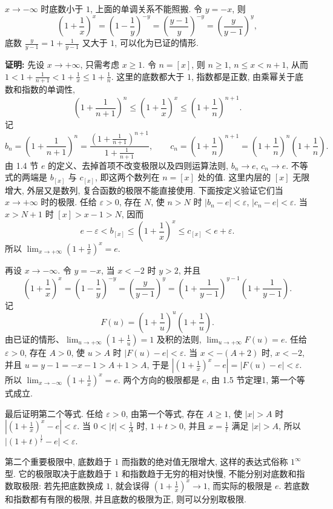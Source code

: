 \documentclass[UTF8,openany]{ctexbook}
\theoremstyle{chinesetextbook}
\newenvironment{cnproof}{\par\indent\textbf{证明:} \ignorespaces}{\par}
\begin{document}
$x\to-\infty$ 时底数小于 $1$, 上面的单调关系不能照搬. 令 $y=-x$, 则
\[
\left(1+\frac1x\right)^x=\left(1-\frac1y\right)^{-y}=\left(\frac{y-1}y\right)^{-y}=\left(\frac y{y-1}\right)^y,
\]
底数 $\displaystyle\frac y{y-1}=1+\frac1{y-1}$ 又大于 $1$, 可以化为已证的情形.
\begin{cnproof}
先设 $x\to+\infty$, 只需考虑 $x\ge1$. 令 $n=[x]$, 则 $n\ge1$, $n\le x<n+1$, 从而 $\displaystyle1<1+\frac1{n+1}<1+\frac1x\le1+\frac1n$. 这里的底数都大于 $1$, 指数都是正数, 由乘幂关于底数和指数的单调性,
\[
\left(1+\frac1{n+1}\right)^n\le\left(1+\frac1x\right)^x\le\left(1+\frac1n\right)^{n+1}.
\]
记
\[
b_n=\left(1+\frac1{n+1}\right)^n=\frac{\left(1+\frac1{n+1}\right)^{n+1}}{1+\frac1{n+1}},\qquad c_n=\left(1+\frac1n\right)^{n+1}=\left(1+\frac1n\right)^n\left(1+\frac1n\right).
\]
由 1.4 节 $e$ 的定义、去掉首项不改变极限以及四则运算法则, $b_n\to e$, $c_n\to e$. 不等式的两端是 $b_{[x]}$ 与 $c_{[x]}$, 即这两个数列在 $n=[x]$ 处的值. 这里内层的 $[x]$ 无限增大, 外层又是数列, 复合函数的极限不能直接使用. 下面按定义验证它们当 $x\to+\infty$ 时的极限. 任给 $\varepsilon>0$, 存在 $N$, 使 $n>N$ 时 $|b_n-e|<\varepsilon$, $|c_n-e|<\varepsilon$. 当 $x>N+1$ 时 $[x]>x-1>N$, 因而
\[
e-\varepsilon<b_{[x]}\le\left(1+\frac1x\right)^x\le c_{[x]}<e+\varepsilon.
\]
所以 $\displaystyle\lim_{x\to+\infty}\left(1+\frac1x\right)^x=e$.

再设 $x\to-\infty$. 令 $y=-x$, 当 $x<-2$ 时 $y>2$, 并且
\[
\left(1+\frac1x\right)^x=\left(1-\frac1y\right)^{-y}=\left(\frac y{y-1}\right)^y=\left(1+\frac1{y-1}\right)^{y-1}\left(1+\frac1{y-1}\right).
\]
记
\[
F(u)=\left(1+\frac1u\right)^u\left(1+\frac1u\right).
\]
由已证的情形、$\displaystyle\lim_{u\to+\infty}\left(1+\frac1u\right)=1$ 及积的法则, $\displaystyle\lim_{u\to+\infty}F(u)=e$. 任给 $\varepsilon>0$, 存在 $A>0$, 使 $u>A$ 时 $|F(u)-e|<\varepsilon$. 当 $x<-(A+2)$ 时, $x<-2$, 并且 $u=y-1=-x-1>A+1>A$, 于是 $\displaystyle\left|\left(1+\frac1x\right)^x-e\right|=|F(u)-e|<\varepsilon$. 所以 $\displaystyle\lim_{x\to-\infty}\left(1+\frac1x\right)^x=e$. 两个方向的极限都是 $e$, 由 1.5 节定理1, 第一个等式成立.

最后证明第二个等式. 任给 $\varepsilon>0$, 由第一个等式, 存在 $A\ge1$, 使 $|x|>A$ 时 $\displaystyle\left|\left(1+\frac1x\right)^x-e\right|<\varepsilon$. 当 $\displaystyle0<|t|<\frac1A$ 时, $1+t>0$, 并且 $\displaystyle x=\frac1t$ 满足 $|x|>A$, 所以 $\bigl|(1+t)^{\frac1t}-e\bigr|<\varepsilon$.
\end{cnproof}
第二个重要极限中, 底数趋于 $1$ 而指数的绝对值无限增大, 这样的表达式俗称 $1^\infty$ 型. 它的极限取决于底数趋于 $1$ 和指数趋于无穷的相对快慢, 不能分别对底数和指数取极限: 若先把底数换成 $1$, 就会误得 $\displaystyle\left(1+\frac1x\right)^x\to1$, 而实际的极限是 $e$. 若底数和指数都有有限的极限, 并且底数的极限为正, 则可以分别取极限.
\end{document}
